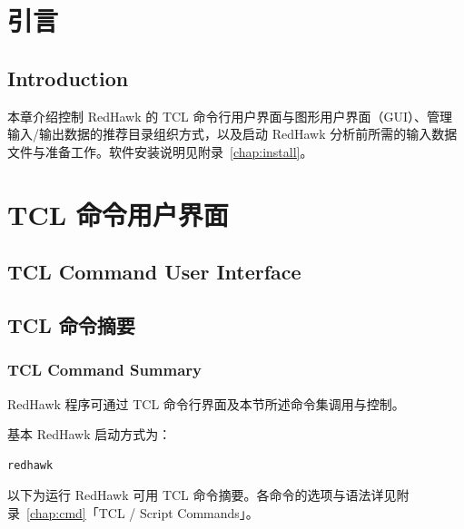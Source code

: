 ﻿%
\label{chap:ui}

\section{引言}
\subsection*{Introduction}

本章介绍控制 RedHawk 的 TCL 命令行用户界面与图形用户界面（GUI）、管理输入/输出数据的推荐目录组织方式，以及启动 RedHawk 分析前所需的输入数据文件与准备工作。软件安装说明见附录~\ref{chap:install}。

\section{TCL 命令用户界面}
\subsection*{TCL Command User Interface}

\subsection{TCL 命令摘要}
\subsubsection*{TCL Command Summary}

RedHawk 程序可通过 TCL 命令行界面及本节所述命令集调用与控制。

基本 RedHawk 启动方式为：
\begin{lstlisting}
redhawk
\end{lstlisting}

以下为运行 RedHawk 可用 TCL 命令摘要。各命令的选项与语法详见附录~\ref{chap:cmd}「TCL / Script Commands」。


